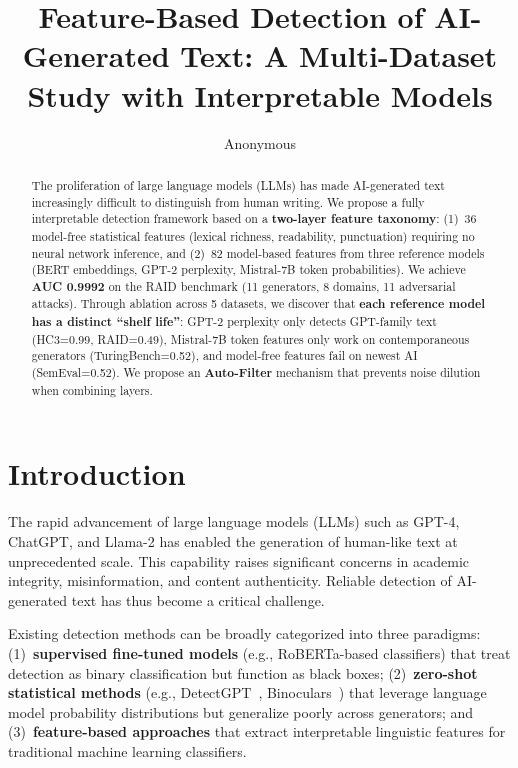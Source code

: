 \documentclass[sigconf,nonacm]{acmart}
\begin{document}
\title{Feature-Based Detection of AI-Generated Text: A Multi-Dataset Study with Interpretable Models}

\author{Anonymous}

\begin{abstract}
The proliferation of large language models (LLMs) has made AI-generated text increasingly difficult to distinguish from human writing. We propose a fully interpretable detection framework based on a \textbf{two-layer feature taxonomy}: (1)~36 model-free statistical features (lexical richness, readability, punctuation) requiring no neural network inference, and (2)~82 model-based features from three reference models (BERT embeddings, GPT-2 perplexity, Mistral-7B token probabilities). We achieve \textbf{AUC 0.9992} on the RAID benchmark (11 generators, 8 domains, 11 adversarial attacks). Through ablation across 5 datasets, we discover that \textbf{each reference model has a distinct ``shelf life''}: GPT-2 perplexity only detects GPT-family text (HC3=0.99, RAID=0.49), Mistral-7B token features only work on contemporaneous generators (TuringBench=0.52), and model-free features fail on newest AI (SemEval=0.52). We propose an \textbf{Auto-Filter} mechanism that prevents noise dilution when combining layers.
\end{abstract}


\maketitle

\section{Introduction}

The rapid advancement of large language models (LLMs) such as GPT-4, ChatGPT, and Llama-2 has enabled the generation of human-like text at unprecedented scale. This capability raises significant concerns in academic integrity, misinformation, and content authenticity. Reliable detection of AI-generated text has thus become a critical challenge.

Existing detection methods can be broadly categorized into three paradigms: (1)~\textbf{supervised fine-tuned models} (e.g., RoBERTa-based classifiers) that treat detection as binary classification but function as black boxes; (2)~\textbf{zero-shot statistical methods} (e.g., DetectGPT~\cite{mitchell2023detectgpt}, Binoculars~\cite{hans2024binoculars}) that leverage language model probability distributions but generalize poorly across generators; and (3)~\textbf{feature-based approaches} that extract interpretable linguistic features for traditional machine learning classifiers.
\end{document}
